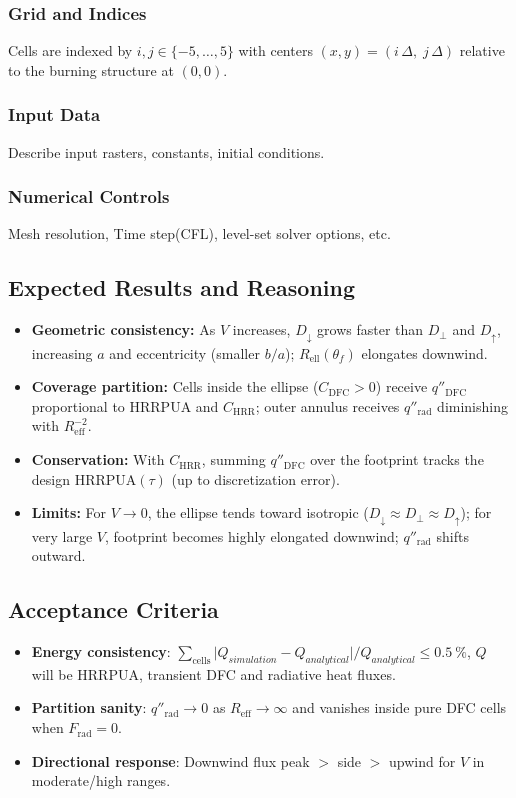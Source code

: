 \documentclass[../report/case_report.tex]{subfiles}
\begin{document}
\subsubsection*{Grid and Indices}
Cells are indexed by $i,j\in\{-5,\dots,5\}$ with centers $(x,y)=(i\,\Delta,\; j\,\Delta)$ relative to the burning structure at $(0,0)$.

\subsubsection{Input Data}
Describe input rasters, constants, initial conditions.


\subsubsection{Numerical Controls}
Mesh resolution, Time step(CFL), level-set solver options, etc.


\subsection{Expected Results and Reasoning}
\begin{itemize}[nosep]
  \item \textbf{Geometric consistency:} As $V$ increases, $D_\downarrow$ grows faster than $D_\perp$ and $D_\uparrow$, increasing $a$ and eccentricity (smaller $b/a$); $R_{\mathrm{ell}}(\theta_f)$ elongates downwind.
  \item \textbf{Coverage partition:} Cells inside the ellipse ($C_{\mathrm{DFC}}>0$) receive $q''_{\mathrm{DFC}}$ proportional to HRRPUA and $C_\mathrm{HRR}$; outer annulus receives $q''_{\mathrm{rad}}$ diminishing with $R_{\mathrm{eff}}^{-2}$.
  \item \textbf{Conservation:} With $C_\mathrm{HRR}$, summing $q''_{\mathrm{DFC}}$ over the footprint tracks the design $\mathrm{HRRPUA}(\tau)$ (up to discretization error).
  \item \textbf{Limits:} For $V\to 0$, the ellipse tends toward isotropic ($D_\downarrow\!\approx D_\perp\!\approx D_\uparrow$); for very large $V$, footprint becomes highly elongated downwind; $q''_{\mathrm{rad}}$ shifts outward.
\end{itemize}

\subsection{Acceptance Criteria}
\begin{itemize}[nosep]
  \item \textbf{Energy consistency}: $\sum_{\text{cells}} \big|Q_{simulation} - Q_{analytical}\big|/Q_{analytical}\le \SI{0.5}{\percent}$, $Q$ will be HRRPUA, transient DFC and radiative heat fluxes.
  \item \textbf{Partition sanity}: $q''_{\mathrm{rad}}\to 0$ as $R_{\mathrm{eff}}\to\infty$ and vanishes inside pure DFC cells when $F_{\mathrm{rad}}=0$.
  \item \textbf{Directional response}: Downwind flux peak $>\!$ side $>\!$ upwind for $V$ in moderate/high ranges.
\end{itemize}
\end{document}
